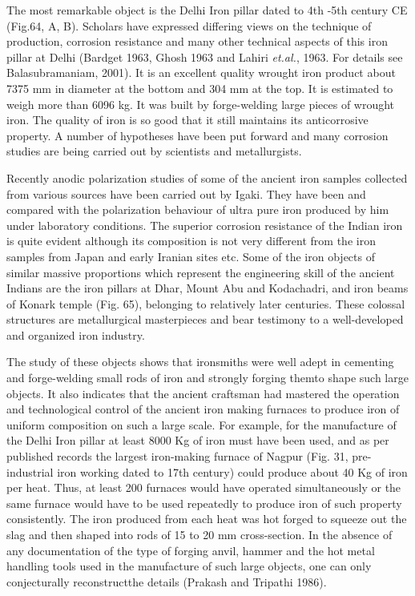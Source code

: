 The most remarkable object is the Delhi Iron pillar dated to 4th -5th century CE (Fig.64, A, B). Scholars have expressed differing views on the technique of production, corrosion resistance and many other technical aspects of this iron pillar at Delhi (Bardget 1963, Ghosh 1963 and Lahiri \textit{et.al.}, 1963. For details see Balasubramaniam, 2001). It is an excellent quality wrought iron product about 7375 mm in diameter at the bottom and 304 mm at the top. It is estimated to weigh more than 6096 kg. It was built by forge-welding large pieces of wrought iron. The quality of iron is so good that it still maintains its anticorrosive property. A number of hypotheses have been put forward and many corrosion studies are being carried out by scientists and metallurgists.

Recently anodic polarization studies of some of the ancient iron samples collected from various sources have been carried out by Igaki. They have been and compared with the polarization behaviour of ultra pure iron produced by him under laboratory conditions. The superior corrosion resistance of the Indian iron is quite evident although its composition is not very different from the iron samples from Japan and early Iranian sites etc. Some of the iron objects of similar massive proportions which represent the engineering skill of the ancient Indians are the iron pillars at Dhar, Mount Abu and Kodachadri, and iron beams of Konark temple (Fig. 65), belonging to relatively later centuries. These colossal structures are metallurgical masterpieces and bear testimony to a well-developed and organized iron industry.

The study of these objects shows that ironsmiths were well adept in cementing and forge-welding small rods of iron and strongly forging themto shape such large objects. It also indicates that the ancient craftsman had mastered the operation and technological control of the ancient iron making furnaces to produce iron of uniform composition on such a large scale. For example, for the manufacture of the Delhi Iron pillar at least 8000 Kg of iron must have been used, and as per published records the largest iron-making furnace of Nagpur (Fig. 31, pre-industrial iron working dated to 17th century) could produce about 40 Kg of iron per heat. Thus, at least 200 furnaces would have operated simultaneously or the same furnace would have to be used repeatedly to produce iron of such property consistently. The iron produced from each heat was hot forged to squeeze out the slag and then shaped into rods of 15 to 20 mm cross-section. In the absence of any documentation of the type of forging anvil, hammer and the hot metal handling tools used in the manufacture of such large objects, one can only conjecturally reconstructthe details (Prakash and Tripathi 1986).

